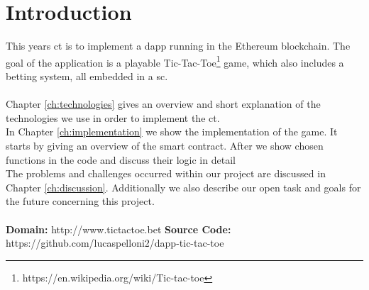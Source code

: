 \chapter{Introduction}\label{ch:introduction}
This years \ac{ct} is to implement a \ac{dapp}  running in the Ethereum blockchain. The goal of the application is a playable Tic-Tac-Toe\footnote{https://en.wikipedia.org/wiki/Tic-tac-toe} game, which also includes a betting system, all embedded in a \ac{sc}.
\\\\
Chapter \ref{ch:technologies} gives an overview and short explanation of the technologies we use in order to implement the \ac{ct}.\\
In Chapter \ref{ch:implementation} we show the implementation of the game. It starts by giving an overview of the smart contract. After we show chosen functions in the code and discuss their logic in detail \\
The problems and challenges occurred within our project are discussed in Chapter \ref{ch:discussion}. Additionally we also describe our open task and goals for the future concerning this project.\\\\
\textbf{Domain:} http://www.tictactoe.bet\newline
\textbf{Source Code:} https://github.com/lucaspelloni2/dapp-tic-tac-toe\newline